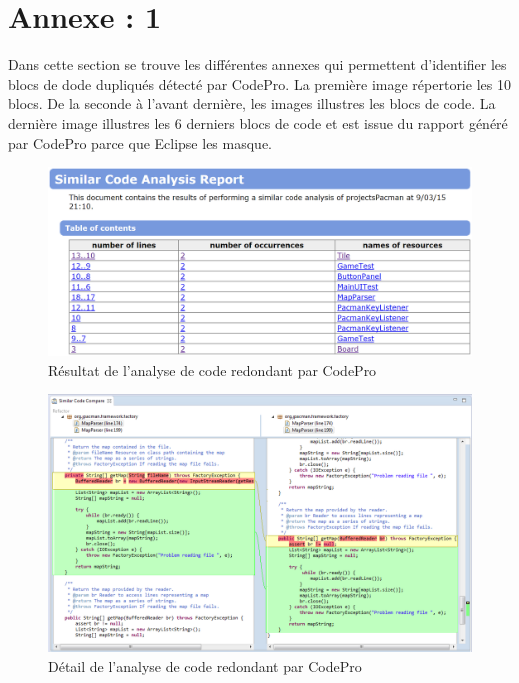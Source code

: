 \documentclass[12pt,a4paper,final]{article}
\begin{document}
\section{Annexe : 1}\label{SimilarCode}
Dans cette section se trouve les différentes annexes qui permettent d'identifier les blocs de dode dupliqués détecté par CodePro. La première image répertorie les 10 blocs. De la seconde à l'avant dernière, les images illustres les blocs de code. La dernière image illustres les 6 derniers blocs de code et est issue du rapport généré par CodePro parce que Eclipse les masque.
\begin{figure}
	\centering
	\includegraphics[width=\textwidth]{images/SimilarCode_00.png}
	\caption{\label{SimilarCode0}Résultat de l'analyse de code redondant par CodePro}
\end{figure}
\begin{figure}
	\centering
	\includegraphics[width=\textwidth]{images/SimilarCode_1.png}
	\caption{\label{SimilarCode1}Détail de l'analyse de code redondant par CodePro}
\end{figure}
\end{document}
